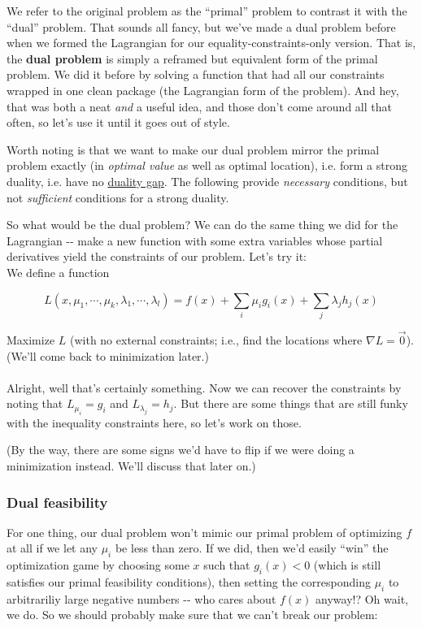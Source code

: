 \documentclass[letterpaper,12pt]{report}
\begin{document}
We refer to the original problem as the ``primal'' problem to contrast it
with the ``dual'' problem. That sounds all fancy, but we've made a dual
problem before when we formed the Lagrangian for our
equality-constraints-only version. That is, the 
\textbf{dual problem}  is simply a
reframed but equivalent form of the primal problem. We did it before by
solving a function that had all our constraints wrapped in one clean
package (the Lagrangian form of the problem). And hey, that was both a
neat \emph{and} a useful idea, and those don't come around all that
often, so let's use it until it goes out of style.

Worth noting is that we want to make our dual problem mirror the primal
problem exactly (in \emph{optimal value} as well as optimal location),
i.e. form a strong duality, i.e. have no
\href{https://en.wikipedia.org/wiki/Duality_gap}{duality gap}. The
following provide \emph{necessary} conditions, but not \emph{sufficient}
conditions for a strong duality.

So what would be the dual problem? We can do the same thing we did for
the Lagrangian -\/- make a new function with some extra variables whose
partial derivatives yield the constraints of our problem. Let's try it:
\\
We define a function

\[L(x,\mu_1, \cdots, \mu_k, \lambda_1, \cdots, \lambda_l) = f(x) + \sum_i \mu_i g_i(x) + \sum_j \lambda_j h_j(x)\]

Maximize \(L\) (with no external constraints; i.e., find the locations
where \(\nabla L = \vec{0}\)). (We'll come back to minimization later.)
\\
\\
Alright, well that's certainly something. Now we can recover the
constraints by noting that \(L_{\mu_i} = g_i\) and
\(L_{\lambda_j} = h_j\). But there are some things that are still funky
with the inequality constraints here, so let's work on those.

(By the way, there are some signs we'd have to flip if we were 
doing a minimization instead. We'll discuss that later on.)

\subsubsection{Dual feasibility}\label{dual-feasibility}

For one thing, our dual problem won't mimic our primal problem of
optimizing \(f\) at all if we let any \(\mu_i\) be less than zero. If we
did, then we'd easily ``win'' the optimization game by choosing some \(x\)
such that \(g_i(x) < 0\) (which is still satisfies our primal
feasibility conditions), then setting the corresponding \(\mu_i\) to
arbitrariliy large negative numbers -\/- who cares about \(f(x)\)
anyway!? Oh wait, we do. So we should probably make sure that we can't
break our problem:
\end{document}
